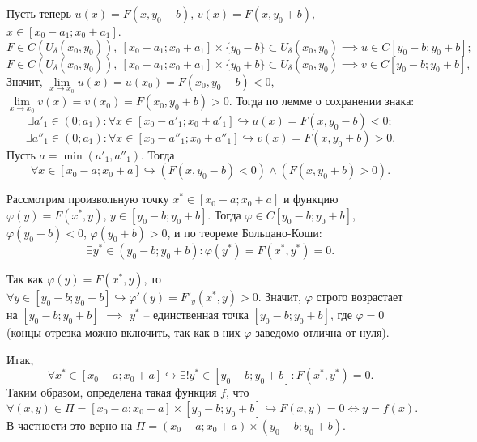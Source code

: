 \documentclass[12pt, a4paper, reqno]{article}
\begin{document}
    Пусть теперь $u(x) = F(x, y_0 - b)$, $v(x) = F(x, y_0 + b)$, $x \in [x_0 - a_1; x_0 + a_1]$.
    \begin{equation*}
        F \in C(U_{\delta}(x_0, y_0)),\ [x_0 - a_1; x_0 + a_1] \times \{y_0 - b\} \subset U_{\delta}(x_0, y_0)
        \implies u \in C[y_0 - b; y_0 + b];
    \end{equation*}
    \begin{equation*}
        F \in C(U_{\delta}(x_0, y_0)),\ [x_0 - a_1; x_0 + a_1] \times \{y_0 + b\} \subset U_{\delta}(x_0, y_0)
        \implies v \in C[y_0 - b; y_0 + b],
    \end{equation*}
    Значит, $\lim\limits_{x \to x_0} u(x) = u(x_0) = F(x_0, y_0 - b) < 0$,
    $\lim\limits_{x \to x_0} v(x) = v(x_0) = F(x_0, y_0 + b) > 0$. Тогда по лемме о сохранении
    знака:
    \begin{equation*}
        \exists a'_1 \in (0; a_1): \forall x \in [x_0 - a'_1; x_0 + a'_1] \hookrightarrow
            u(x) = F(x, y_0 - b) < 0;
    \end{equation*}
    \begin{equation*}
        \exists a''_1 \in (0; a_1): \forall x \in [x_0 - a''_1; x_0 + a''_1] \hookrightarrow
            v(x) = F(x, y_0 + b) > 0.
    \end{equation*}
    Пусть $a = \min(a'_1, a''_1)$. Тогда
    \begin{equation*}
        \forall x \in [x_0 - a; x_0 + a] \hookrightarrow (F(x, y_0 - b) < 0) \wedge (F(x, y_0 + b) > 0).
    \end{equation*}

    Рассмотрим произвольную точку $x^* \in [x_0 - a; x_0 + a]$ и функцию $\varphi(y) = F(x^*, y)$,
    $y \in [y_0 - b; y_0 + b]$. Тогда $\varphi \in C[y_0 - b; y_0 + b]$, $\varphi(y_0 - b) < 0$,
    $\varphi(y_0 + b) > 0$, и по теореме Больцано-Коши:
    \begin{equation*}
        \exists y^* \in (y_0 - b; y_0 + b): \varphi(y^*) = F(x^*, y^*) = 0.
    \end{equation*}

    Так как $\varphi(y) = F(x^*, y)$, то $\forall y \in [y_0 - b; y_0 + b] \hookrightarrow
    \varphi'(y) = F'_y(x^*, y) > 0$. Значит, $\varphi$ строго возрастает на $[y_0 - b; y_0 + b]$
    $\implies$ $y^*$ -- единственная точка $[y_0 - b; y_0 + b]$, где $\varphi = 0$ (концы отрезка
    можно включить, так как в них $\varphi$ заведомо отлична от нуля).

    Итак,
    \begin{equation*}
        \forall x^* \in [x_0 - a; x_0 + a] \hookrightarrow \exists! y^* \in [y_0 - b; y_0 + b]:
        F(x^*, y^*) = 0.
    \end{equation*}
    Таким образом, определена такая функция $f$, что
    \begin{equation*}
        \forall (x, y) \in \overline{\Pi} = [x_0 - a; x_0 + a] \times [y_0 - b; y_0 + b]
        \hookrightarrow F(x, y) = 0 \iff y = f(x).
    \end{equation*}
    В частности это верно на $\Pi = (x_0 - a; x_0 + a) \times (y_0 - b; y_0 + b)$.
\end{document}
